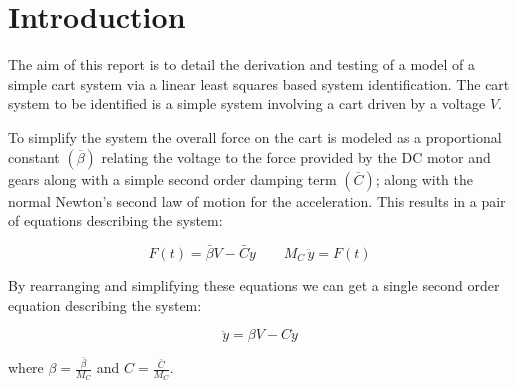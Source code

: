 \section*{Introduction}

The aim of this report is to detail the derivation and testing of a model of a
simple cart system via a linear least squares based system identification.  The
cart system to be identified is a simple system involving a cart driven by a
voltage $V$.  

To simplify the system the overall force on the cart is modeled as a
proportional constant $\left(\overline\beta\right)$ relating the voltage to the
force provided by the DC motor and gears along with a simple second order
damping term $\left(\overline{C}\right)$; along with the normal Newton's second
law of motion for the acceleration.  This results in a pair of equations
describing the system:

\begin{equation}
F\left(t\right) = \bar\beta V - \bar{C} \dot{y} \qquad M_C \, \ddot{y} = F\left(t\right)
\end{equation}

By rearranging and simplifying these equations we can get a single second order
equation describing the system:

\begin{equation}
\ddot{y} = \beta V - C \dot{y}
\end{equation}

where $\beta = \frac{\bar\beta}{M_C}$ and $C = \frac{\bar{C}}{M_C}$.
